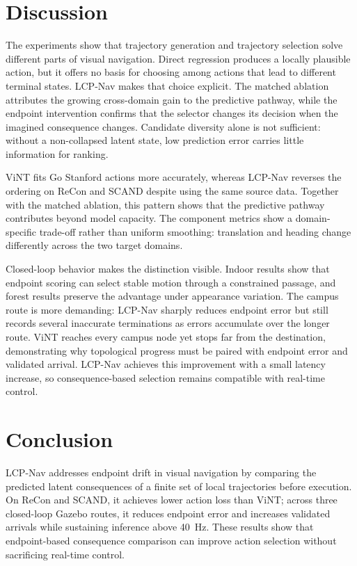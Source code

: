 \documentclass[conference]{IEEEtran}
\begin{document}
\enlargethispage{-1.25in}
\section{Discussion}

The experiments show that trajectory generation and trajectory selection solve different parts of visual navigation. Direct regression produces a locally plausible action, but it offers no basis for choosing among actions that lead to different terminal states. LCP-Nav makes that choice explicit. The matched ablation attributes the growing cross-domain gain to the predictive pathway, while the endpoint intervention confirms that the selector changes its decision when the imagined consequence changes. Candidate diversity alone is not sufficient: without a non-collapsed latent state, low prediction error carries little information for ranking.

ViNT fits Go Stanford actions more accurately, whereas LCP-Nav reverses the ordering on ReCon and SCAND despite using the same source data. Together with the matched ablation, this pattern shows that the predictive pathway contributes beyond model capacity. The component metrics show a domain-specific trade-off rather than uniform smoothing: translation and heading change differently across the two target domains.

Closed-loop behavior makes the distinction visible. Indoor results show that endpoint scoring can select stable motion through a constrained passage, and forest results preserve the advantage under appearance variation. The campus route is more demanding: LCP-Nav sharply reduces endpoint error but still records several inaccurate terminations as errors accumulate over the longer route. ViNT reaches every campus node yet stops far from the destination, demonstrating why topological progress must be paired with endpoint error and validated arrival. LCP-Nav achieves this improvement with a small latency increase, so consequence-based selection remains compatible with real-time control.

\section{Conclusion}

LCP-Nav addresses endpoint drift in visual navigation by comparing the predicted latent consequences of a finite set of local trajectories before execution. On ReCon and SCAND, it achieves lower action loss than ViNT; across three closed-loop Gazebo routes, it reduces endpoint error and increases validated arrivals while sustaining inference above 40~Hz. These results show that endpoint-based consequence comparison can improve action selection without sacrificing real-time control.
\end{document}
